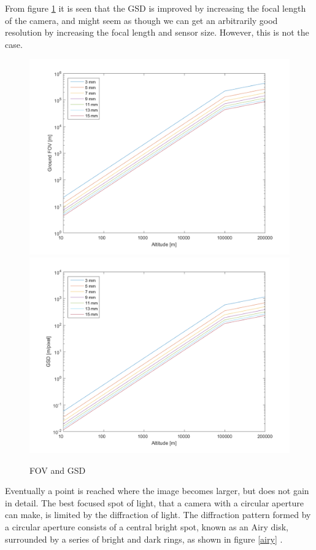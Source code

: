 From figure \ref{cameramatlab} it is seen that the GSD is improved by increasing the focal length of the camera, and might seem as though we can get an arbitrarily good resolution by increasing the focal length and sensor size. However, this is not the case. 
\begin{figure}
\begin{center}
\includegraphics[width=\textwidth]{figures/navtheory/FOV} 
\includegraphics[width=\textwidth]{figures/navtheory/GSD}
\caption{FOV and GSD}
\label{cameramatlab}
\end{center}
\end{figure}

Eventually a point is reached where the image becomes larger, but does not gain in detail. The best focused spot of light, that a camera with a circular aperture can make, is limited by the diffraction of light. The diffraction pattern formed by a circular aperture consists of a central bright spot, known as an Airy disk, surrounded by a series of bright and dark rings, as shown in figure \ref{airy} \cite{uniphys}.

